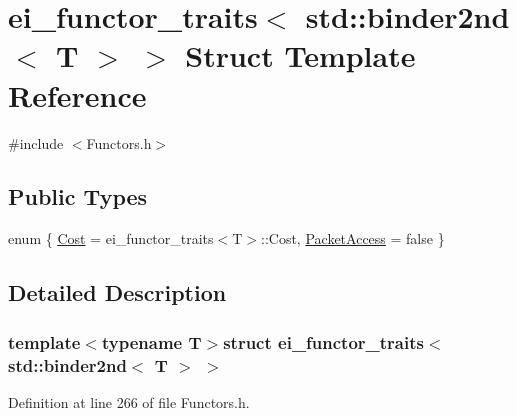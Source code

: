 \hypertarget{structei__functor__traits_3_01std_1_1binder2nd_3_01_t_01_4_01_4}{\section{ei\-\_\-functor\-\_\-traits$<$ std\-:\-:binder2nd$<$ T $>$ $>$ Struct Template Reference}
\label{structei__functor__traits_3_01std_1_1binder2nd_3_01_t_01_4_01_4}
}


{\ttfamily \#include $<$Functors.\-h$>$}

\subsection*{Public Types}
\begin{DoxyCompactItemize}
\item 
enum \{ \hyperlink{structei__functor__traits_3_01std_1_1binder2nd_3_01_t_01_4_01_4_afd5a6fffaf4f83fcd36b5d3cf80fb9c1a6f4d278ce8c1ab3ec408d0a19d39cabf}{Cost} = ei\-\_\-functor\-\_\-traits$<$T$>$\-:\-:Cost, 
\hyperlink{structei__functor__traits_3_01std_1_1binder2nd_3_01_t_01_4_01_4_afd5a6fffaf4f83fcd36b5d3cf80fb9c1a94e4334c9b44f2351bfa0a37e257f8a8}{Packet\-Access} = false
 \}
\end{DoxyCompactItemize}


\subsection{Detailed Description}
\subsubsection*{template$<$typename T$>$struct ei\-\_\-functor\-\_\-traits$<$ std\-::binder2nd$<$ T $>$ $>$}



Definition at line 266 of file Functors.\-h.




